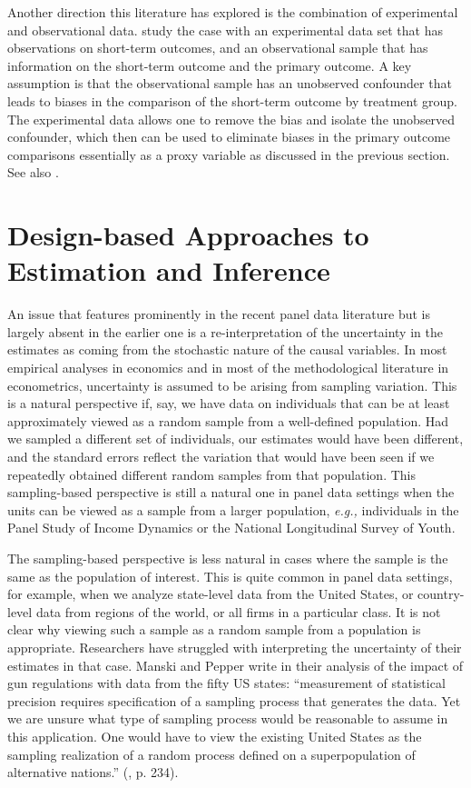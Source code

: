 \documentclass[letterpaper,12pt,leqno]{article}
\begin{document}
Another direction this literature has explored is the combination of experimental and observational data.
\citep{athey2020combining} study the case with an experimental data set that has observations on short-term outcomes, and an observational sample that has information on the short-term outcome and the primary outcome. A key assumption is that the observational sample has an unobserved confounder that leads to biases in the comparison of the short-term outcome by treatment group. The experimental data allows one to remove the bias and isolate the unobserved confounder, which then can be used to eliminate biases in the primary outcome comparisons essentially as a proxy variable as discussed in the previous section.
See also \citep{ghassami2022combining, imbens2021controlling, kallus2020role}.

 

\section{Design-based Approaches to Estimation and Inference}\label{section:design}

An issue that features prominently in the recent panel data literature but is largely absent in the earlier one is a re-interpretation of the uncertainty in the estimates as coming from the stochastic nature of the causal variables. In most empirical analyses in economics and in most of the methodological literature in econometrics, uncertainty is assumed to be arising from sampling variation. This is a natural perspective if, say, we have data on individuals that can be at least approximately viewed as a random sample from a well-defined population. Had we sampled a different set of individuals, our estimates would have been different, and the standard errors reflect the variation that would have been seen if we repeatedly obtained different random samples from that population. This sampling-based perspective is still a natural one in panel data settings when the units can be viewed as a sample from a larger population, {\it e.g.,} individuals in the Panel Study of Income Dynamics or the National Longitudinal Survey of Youth.

The sampling-based perspective is less natural in cases where the sample is the same as the population of interest. This is quite common in panel data settings, for example, when we analyze state-level data from the United States, or country-level data from regions of the world, or all firms in a particular class. It is not clear why viewing such a sample as a random sample from a population is appropriate.
Researchers have struggled with interpreting the uncertainty of their estimates in that case.
Manski and Pepper write in their analysis of the impact of gun regulations with data from the fifty US states: ``measurement of
statistical precision requires specification of a sampling process that generates the data. Yet we are unsure what type of sampling process would be reasonable to assume in this
application. One would have to view the existing United States as the sampling realization of a random process defined on a superpopulation of alternative nations.'' (\citealp{manski2018right}, p. 234).
\end{document}
